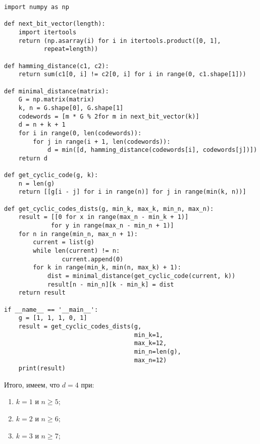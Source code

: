 \documentclass{article}
\begin{document}
\begin{lstlisting}[frame=single]
import numpy as np

def next_bit_vector(length):
    import itertools
    return (np.asarray(i) for i in itertools.product([0, 1], 
           repeat=length))

def hamming_distance(c1, c2):
    return sum(c1[0, i] != c2[0, i] for i in range(0, c1.shape[1]))

def minimal_distance(matrix):
    G = np.matrix(matrix)
    k, n = G.shape[0], G.shape[1]
    codewords = [m * G % 2for m in next_bit_vector(k)]
    d = n + k + 1
    for i in range(0, len(codewords)):
        for j in range(i + 1, len(codewords)):
            d = min([d, hamming_distance(codewords[i], codewords[j])])
    return d

def get_cyclic_code(g, k):
    n = len(g)
    return [[g[i - j] for i in range(n)] for j in range(min(k, n))]

def get_cyclic_codes_dists(g, min_k, max_k, min_n, max_n):
    result = [[0 for x in range(max_n - min_k + 1)] 
             for y in range(max_n - min_n + 1)]
    for n in range(min_n, max_n + 1):
        current = list(g)
        while len(current) != n:
                current.append(0)
        for k in range(min_k, min(n, max_k) + 1):
            dist = minimal_distance(get_cyclic_code(current, k))
            result[n - min_n][k - min_k] = dist
    return result

if __name__ == '__main__':
    g = [1, 1, 1, 0, 1]
    result = get_cyclic_codes_dists(g, 
                                    min_k=1, 
                                    max_k=12,
                                    min_n=len(g), 
                                    max_n=12)
    print(result)
\end{lstlisting}

Итого, имеем, что $d=4$ при:
\begin{enumerate}
    \item $k = 1$ и $n \geq 5$;
    \item $k = 2$ и $n \geq 6$;
    \item $k = 3$ и $n \geq 7$;
\end{enumerate}
%
\end{document}

